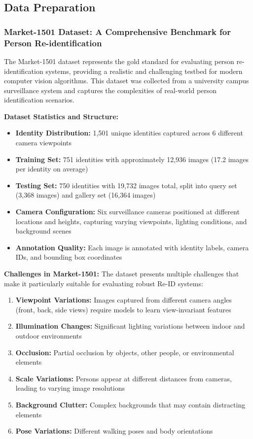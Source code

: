 \documentclass[a4paper,12pt]{article}
\begin{document}
\subsection{Data Preparation}

\subsubsection{Market-1501 Dataset: A Comprehensive Benchmark for Person Re-identification}

The Market-1501 dataset represents the gold standard for evaluating person re-identification systems, providing a realistic and challenging testbed for modern computer vision algorithms. This dataset was collected from a university campus surveillance system and captures the complexities of real-world person identification scenarios.

\textbf{Dataset Statistics and Structure:}
\begin{itemize}
    \item \textbf{Identity Distribution:} 1,501 unique identities captured across 6 different camera viewpoints
    \item \textbf{Training Set:} 751 identities with approximately 12,936 images (17.2 images per identity on average)
    \item \textbf{Testing Set:} 750 identities with 19,732 images total, split into query set (3,368 images) and gallery set (16,364 images)
    \item \textbf{Camera Configuration:} Six surveillance cameras positioned at different locations and heights, capturing varying viewpoints, lighting conditions, and background scenes
    \item \textbf{Annotation Quality:} Each image is annotated with identity labels, camera IDs, and bounding box coordinates
\end{itemize}

\textbf{Challenges in Market-1501:}
The dataset presents multiple challenges that make it particularly suitable for evaluating robust Re-ID systems:
\begin{enumerate}
    \item \textbf{Viewpoint Variations:} Images captured from different camera angles (front, back, side views) require models to learn view-invariant features
    \item \textbf{Illumination Changes:} Significant lighting variations between indoor and outdoor environments
    \item \textbf{Occlusion:} Partial occlusion by objects, other people, or environmental elements
    \item \textbf{Scale Variations:} Persons appear at different distances from cameras, leading to varying image resolutions
    \item \textbf{Background Clutter:} Complex backgrounds that may contain distracting elements
    \item \textbf{Pose Variations:} Different walking poses and body orientations
\end{enumerate}
\end{document}
